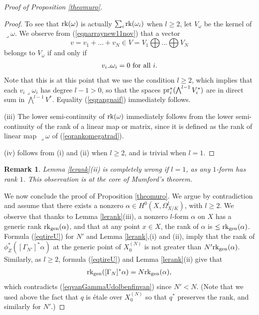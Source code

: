 \documentclass[10pt]{article}
\newtheorem{rema}[theo]{Remark}
\begin{document}
\begin{proof}[Proof of Proposition  \ref{theomuro}]
\begin{proof}
To see that ${\rm rk}(\omega)$ is  actually  $ \sum_i{\rm rk}(\omega_i)$ when $l\geq 2$, let $V_\omega$ be the kernel of $\lrcorner\omega$.
 We observe from (\ref{eqnarraynew11nov}) that a vector $$v=v_1+\ldots+ v_N\in V=V_1\bigoplus \ldots\bigoplus V_N$$ belongs to $V_\omega$ if and only if \begin{eqnarray}\label{eqvanpourle}v_i\lrcorner\omega_i=0\,\,{\rm  for\,\, all}\,\, i. \end{eqnarray}
Note that this is at this point that we use the condition $l\geq 2$, which implies that each $v_i\lrcorner\omega_i$ has degree $l-1>0$, so that the spaces  ${\rm pr}_i^*(\bigwedge^{l-1}V_i^*)$ are in direct sum in $\bigwedge^{l-1}V^*$.
Equality (\ref{eqrangnaif}) immediately  follows.



(iii) The lower semi-continuity of ${\rm rk}(\omega)$ immediately follows from the lower semi-continuity of the rank of a linear map or matrix, since it is defined as the rank of linear map $\lrcorner\omega$ of (\ref{eqrankomegatrad}).

(iv) follows from (i) and (ii) when $l\geq 2$, and is trivial when $l=1$.
\end{proof}
\begin{rema}{\rm Lemma \ref{lerank}(ii) is completely wrong if $l=1$, as any $1$-form has rank $1$. This observation is at the core of Mumford's theorem.}\end{rema}




We now conclude the proof of Proposition  \ref{theomuro}.  We argue by contradiction and assume that there exists a nonzero $\alpha\in H^0(X,\Omega_{X/K}^l)$, with $l\geq 2$.
We observe that thanks to Lemma \ref{lerank}(iii), a nonzero $l$-form $\alpha$ on $X$ has a generic  rank ${\rm rk}_{\rm gen}(\alpha)$, and that at any point $x\in X$, the  rank of $\alpha$ is $\leq {\rm rk}_{\rm gen}(\alpha)$.
Formula (\ref{eqtireU}) for $N'$ and Lemma \ref{lerank},(i) and (ii), imply that the  rank of $\phi_Z^*([\Gamma_{N'}]^*\alpha)$  at the generic point of $X^{(N)}_0$ is not greater than $ N'{\rm rk}_{\rm gen}(\alpha)$. Similarly, as $l\geq2$, formula (\ref{eqtireU}) and  Lemma \ref{lerank}(ii) give that
\begin{eqnarray}\label{eqgenrankgamman2611}{\rm rk}_{\rm gen}([\Gamma_{N}]^*\alpha)=  N{\rm rk}_{\rm gen}(\alpha),
\end{eqnarray}
which contradicts (\ref{eqvanGammaUdolbenfinvan}) since $N'<N$. (Note that  we used above  the fact that $q$ is \'etale over $X^{(N)}_0$ so that $q^*$ preserves the rank,  and similarly for $N'$.)
\end{proof}
\end{document}
